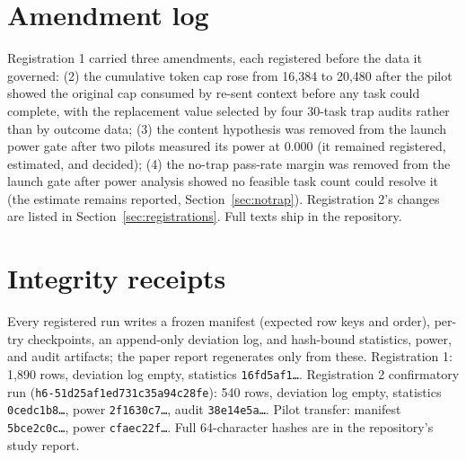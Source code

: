\documentclass[11pt]{article}
\begin{document}



\appendix

\section{Amendment log}
\label{app:amendments}

Registration 1 carried three amendments, each registered before the data it
governed: (2) the cumulative token cap rose from 16{,}384 to 20{,}480 after
the pilot showed the original cap consumed by re-sent context before any
task could complete, with the replacement value selected by four 30-task
trap audits rather than by outcome data; (3) the content hypothesis was
removed from the launch power gate after two pilots measured its power at
0.000 (it remained registered, estimated, and decided); (4) the no-trap
pass-rate margin was removed from the launch gate after power analysis
showed no feasible task count could resolve it (the estimate remains
reported, Section~\ref{sec:notrap}). Registration 2's changes are listed in
Section~\ref{sec:registrations}. Full texts ship in the repository.

\section{Integrity receipts}
\label{app:receipts}

Every registered run writes a frozen manifest (expected row keys and order),
per-try checkpoints, an append-only deviation log, and hash-bound statistics,
power, and audit artifacts; the paper report regenerates only from these.
Registration 1: 1,890 rows, deviation log empty, statistics
\texttt{16fd5af1\ldots}. Registration 2 confirmatory run
(\texttt{h6-51d25af1ed731c35a94c28fe}): 540 rows, deviation log empty,
statistics \texttt{0cedc1b8\ldots}, power \texttt{2f1630c7\ldots}, audit
\texttt{38e14e5a\ldots}. Pilot transfer: manifest \texttt{5bce2c0c\ldots},
power \texttt{cfaec22f\ldots}. Full 64-character hashes are in the
repository's study report.
\end{document}
